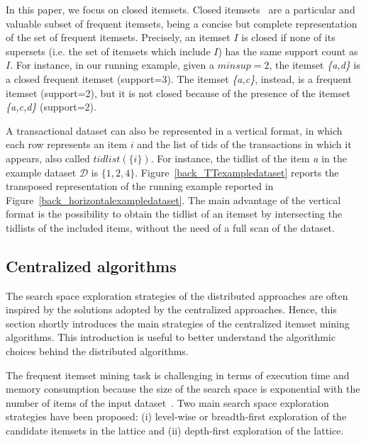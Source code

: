 \documentclass[preprint,review,12pt]{elsarticle}
\begin{document}
In this paper, we focus on closed itemsets.
Closed itemsets~\cite{ClosedPasquier1999} are a
particular and valuable subset of frequent itemsets, being
a concise but complete representation of the set of frequent itemsets. 
Precisely, an itemset $I$ is closed if none of its supersets (i.e. the set of itemsets which include $I$) has the same support count as $I$. For instance, in our running example, given a $minsup=2$, the itemset \textit{\{a,d\}} is a closed frequent itemset (support=3). The itemset \textit{\{a,c\}}, instead, is a frequent itemset (support=2), but it is not closed because of the presence of the itemset \textit{\{a,c,d\}} (support=2). 

A transactional dataset can also be represented in a vertical format, in which each
row represents an item $i$ and the list of tids of the transactions in which it appears,
also called $tidlist(\{i\})$.
For instance, the tidlist of the item \textit{a} in
the example dataset $\mathcal{D}$ is $\{1,2,4\}$.
Figure~\ref{back_TTexampledataset} reports the transposed representation of the
running example reported in Figure~\ref{back_horizontalexampledataset}. The main
advantage of the vertical format is the possibility to obtain the tidlist of
an itemset by intersecting the tidlists of the included items, without the
need of a full scan of the dataset.

\subsection{Centralized algorithms}
\label{centralized}
The search space exploration strategies of the distributed approaches are often inspired by the solutions adopted by the centralized approaches.
Hence, this section shortly introduces the main strategies of the centralized itemset mining algorithms. This introduction is useful to better understand the algorithmic choices behind the distributed algorithms.

The frequent itemset mining task is challenging in terms of execution time and memory consumption because the size of the search space is exponential with the number of items of the input dataset~\cite{goethals2003survey}.
Two main search space exploration strategies have been proposed: 
(i) level-wise or breadth-first exploration of the candidate itemsets in the lattice and 
(ii) depth-first exploration of the lattice.
\end{document}
